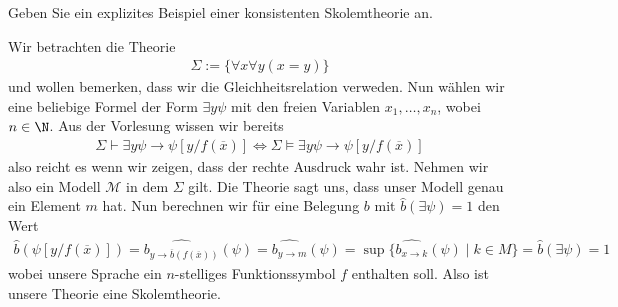 
\begin{exercise}[144]
Geben Sie ein explizites Beispiel einer konsistenten Skolemtheorie an.
\end{exercise}


\begin{solution}
	Wir betrachten die Theorie 
	\begin{align*}
	\Sigma := \{\forall x \forall y (x = y)\}
	\end{align*}
	und wollen bemerken, dass wir die Gleichheitsrelation verweden. Nun wählen wir eine beliebige Formel der Form $\exists y \psi$ mit den freien Variablen $x_1, \dots, x_n$, wobei $n \in \N$. Aus der Vorlesung wissen wir bereits
	\begin{align*}
	\Sigma \vdash \exists y \psi \rightarrow \psi[y/f(\overline{x})] \Leftrightarrow \Sigma \vDash \exists y \psi \rightarrow \psi[y/f(\overline{x})]
	\end{align*}
	also reicht es wenn wir zeigen, dass der rechte Ausdruck wahr ist. Nehmen wir also ein Modell $\mathscr{M}$ in dem $\Sigma$ gilt. Die Theorie sagt uns, dass unser Modell genau ein Element $m$ hat. Nun berechnen wir für eine Belegung $b$ mit $\widehat{b}(\exists \psi) = 1$ den Wert
	\begin{align*}
	\widehat b(\psi[y/f(\overline{x})]) = \widehat{b_{y \to \overline{b}(f(\overline{x}))}}(\psi) = \widehat{b_{y \to m}}(\psi) = \sup\{\widehat{b_{x \to k}}(\psi) \mid k \in M\} = \widehat{b}(\exists \psi) = 1
	\end{align*}
	wobei unsere Sprache ein $n$-stelliges Funktionssymbol $f$ enthalten soll. Also ist unsere Theorie eine Skolemtheorie.
\end{solution}

